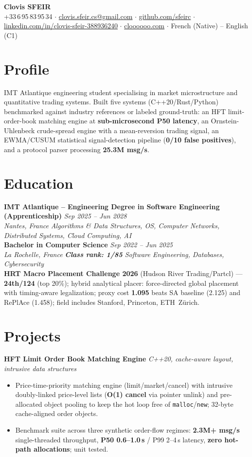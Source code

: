 \documentclass[10pt]{article}
\newcommand{\entry}[4]{%
  \noindent\textbf{#1} \hfill \textit{#2} \\
  \textit{#3} \hfill \textit{#4}\\[-0.3em]
}
\newcommand{\projectentry}[2]{%
  \noindent\textbf{#1} \hfill \textit{#2}\\[-0.3em]
}
\begin{document}
\fontsize{9.3pt}{11pt}\selectfont
\begin{center}
  {\LARGE \textbf{Clovis SFEIR}}\\[0.3em]
  +33\,6\,95\,83\,95\,34 \;$\cdot$\; \href{mailto:clovis.sfeir.cs@gmail.com}{clovis.sfeir.cs@gmail.com} \;$\cdot$\;
  \href{https://github.com/sfeirc}{github.com/sfeirc} \;$\cdot$\;
  \href{https://linkedin.com/in/clovis-sfeir-388936240}{linkedin.com/in/clovis-sfeir-388936240} \;$\cdot$\;
  \href{https://cloooooo.com}{cloooooo.com} \;$\cdot$\; French (Native) -- English (C1)
\end{center}

\section*{Profile}
IMT Atlantique engineering student specialising in market microstructure and quantitative trading systems. Built five systems (C++20/Rust/Python) benchmarked against industry references or labeled ground-truth: an HFT limit-order-book matching engine at \textbf{sub-microsecond P50 latency}, an Ornstein-Uhlenbeck crude-spread engine with a mean-reversion trading signal, an EWMA/CUSUM statistical signal-detection pipeline (\textbf{0/10 false positives}), and a protocol parser processing \textbf{25.3M msg/s}.

\section*{Education}
\entry{IMT Atlantique -- Engineering Degree in Software Engineering (Apprenticeship)}{Sep 2025 -- Jun 2028}{Nantes, France}{Algorithms \& Data Structures, OS, Computer Networks, Distributed Systems, Cloud Computing, AI}
\entry{Bachelor in Computer Science}{Sep 2022 -- Jun 2025}{La Rochelle, France}{\textbf{Class rank: 1/85} \textbar{} Software Engineering, Databases, Cybersecurity}
\noindent\textbf{HRT Macro Placement Challenge 2026} (Hudson River Trading/Partcl) --- \textbf{24th/124} (top 20\%); hybrid analytical placer: force-directed global placement with timing-aware legalization; proxy cost \textbf{1.095} beats SA baseline (2.125) and RePlAce (1.458); field includes Stanford, Princeton, ETH~Z\"urich.

\section*{Projects}

\projectentry{HFT Limit Order Book Matching Engine}{C++20, cache-aware layout, intrusive data structures}
\begin{itemize}
  \item Price-time-priority matching engine (limit/market/cancel) with intrusive doubly-linked price-level lists (\textbf{O(1) cancel} via pointer unlink) and pre-allocated object pooling to keep the hot loop free of \texttt{malloc}/\texttt{new}; 32-byte cache-aligned order objects.
  \item Benchmark suite across three synthetic order-flow regimes: \textbf{2.3M+ msg/s} single-threaded throughput, \textbf{P50 0.6--1.0\,\textmu s} / P99 2--4\,\textmu s latency, \textbf{zero hot-path allocations}; unit tested.
\end{itemize}
\end{document}
